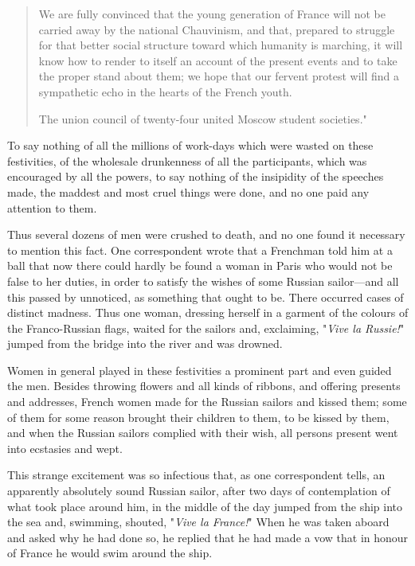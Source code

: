 \documentclass{book}
\begin{document}
\begin{quotation}
	We are fully convinced that the young generation of France will not be carried away by the national Chauvinism, and that, prepared to struggle for that better social structure toward which humanity is marching, it will know how to render to itself an account of the present events and to take the proper stand about them; we hope that our fervent protest will find a sympathetic echo in the hearts of the French youth.

	The union council of twenty-four united Moscow student societies."

\end{quotation}

To say nothing of all the millions of work-days which were wasted on these festivities, of the wholesale drunkenness of all the participants, which was encouraged by all the powers, to say nothing of the insipidity of the speeches made, the maddest and most cruel things were done, and no one paid any attention to them.

Thus several dozens of men were crushed to death, and no one found it necessary to mention this fact. One correspondent wrote that a Frenchman told him at a ball that now there could hardly be found a woman in Paris who would not be false to her duties, in order to satisfy the wishes of some Russian sailor—and all this passed by unnoticed, as something that ought to be. There occurred cases of distinct madness. Thus one woman, dressing herself in a garment of the colours of the Franco-Russian flags, waited for the sailors and, exclaiming, "\emph{Vive la Russie!}" jumped from the bridge into the river and was drowned.

Women in general played in these festivities a prominent part and even guided the men. Besides throwing flowers and all kinds of ribbons, and offering presents and addresses, French women made for the Russian sailors and kissed them; some of them for some reason brought their children to them, to be kissed by them, and when the Russian sailors complied with their wish, all persons present went into ecstasies and wept.

This strange excitement was so infectious that, as one correspondent tells, an apparently absolutely sound Russian sailor, after two days of contemplation of what took place around him, in the middle of the day jumped from the ship into the sea and, swimming, shouted, "\emph{Vive la France!}" When he was taken aboard and asked why he had done so, he replied that he had made a vow that in honour of France he would swim around the ship.
\end{document}
